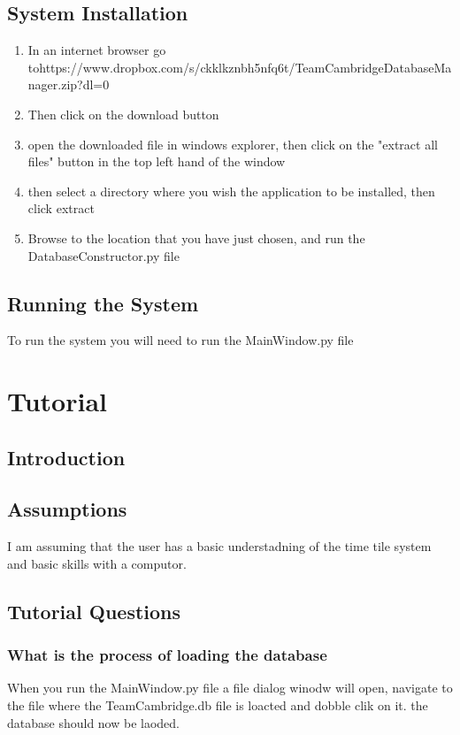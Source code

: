 \subsection{System Installation}
\begin{enumerate}
\item In an internet browser go to\newline https://www.dropbox.com/s/ckklkznbh5nfq6t/TeamCambridgeDatabaseManager.zip?dl=0
\item Then click on the download button
\item open the downloaded file in windows explorer, then click on the "extract all files" button in the top left hand of the window
\item then select a directory where you wish the application to be installed, then click extract
\item Browse to the location that you have just chosen, and run the  DatabaseConstructor.py file
\end{enumerate}
\subsection{Running the System}
To run the system you will need to run the MainWindow.py file
\section{Tutorial}

\subsection{Introduction}

\subsection{Assumptions}
I am assuming that the user has a basic understadning of the time tile system and basic skills with a computor.
\subsection{Tutorial Questions}

\subsubsection{What is the process of loading the database}
When you run the MainWindow.py file a file dialog winodw will open, navigate to the file where the TeamCambridge.db file is loacted and dobble clik on it. the database should now be laoded.

